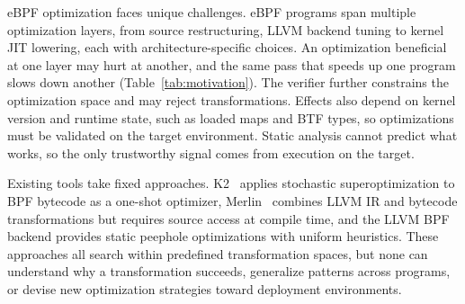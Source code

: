 \documentclass[sigplan,10pt,anonymous,nonacm]{acmart}
\begin{document}
eBPF optimization faces unique challenges.
eBPF programs span multiple optimization layers, from source restructuring, LLVM backend tuning to kernel JIT lowering, each with architecture-specific choices. An optimization beneficial at one layer may hurt at another, and the same pass that speeds up one program slows down another (Table~\ref{tab:motivation}).
The verifier further constrains the optimization space and may reject transformations.
Effects also depend on kernel version and runtime state, such as loaded maps and BTF types, so optimizations must be validated on the target environment.
Static analysis cannot predict what works, so the only trustworthy signal comes from execution on the target.

Existing tools take fixed approaches. K2~\cite{xu2021synthesizing} applies stochastic superoptimization to BPF bytecode as a one-shot optimizer, Merlin~\cite{mao2024merlin} combines LLVM IR and bytecode transformations but requires source access at compile time, and the LLVM BPF backend provides static peephole optimizations with uniform heuristics.
These approaches all search within predefined transformation spaces, but none can understand why a transformation succeeds, generalize patterns across programs, or devise new optimization strategies toward deployment environments.
\end{document}
